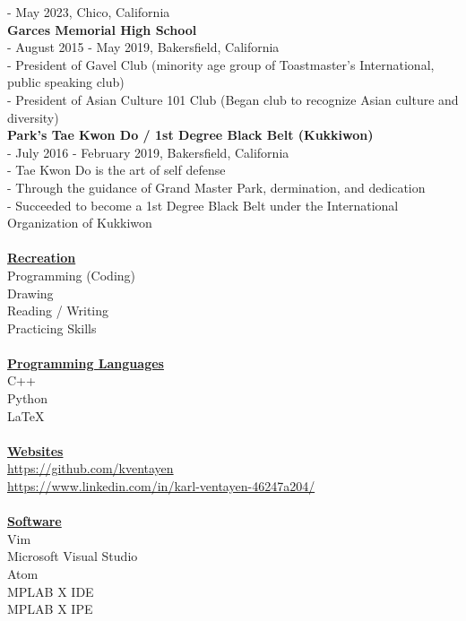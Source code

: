 \documentclass[10pt, letterpaper]{article}                %
\begin{document}
\tab \tab - May 2023, Chico, California\\
\textbf{Garces Memorial High School}\\
\tab \tab - August 2015 - May 2019, Bakersfield, California\\
\tab \tab - President of Gavel Club (minority age group of Toastmaster's International, public speaking club)\\
\tab \tab - President of Asian Culture 101 Club (Began club to recognize Asian culture and diversity)\\
\textbf{Park's Tae Kwon Do / 1st Degree Black Belt (Kukkiwon)}\\
\tab \tab - July 2016 - February 2019, Bakersfield, California\\
\tab \tab - Tae Kwon Do is the art of self defense\\
\tab \tab - Through the guidance of Grand Master Park, dermination, and dedication\\
\tab \tab - Succeeded to become a 1st Degree Black Belt under the International Organization of Kukkiwon\\
\\
\textbf{\underline{Recreation}}\\
Programming (Coding)\\
Drawing\\
Reading / Writing\\
Practicing Skills\\
\\
\textbf{\underline{Programming Languages}}\\
C++\\
Python\\
LaTeX\\
\\
\textbf{\underline{Websites}}\\
\url{https://github.com/kventayen}\\
\url{https://www.linkedin.com/in/karl-ventayen-46247a204/}\\
\\
\textbf{\underline{Software}}\\
Vim\\
Microsoft Visual Studio\\
Atom\\
MPLAB X IDE\\
MPLAB X IPE
\end{document}
